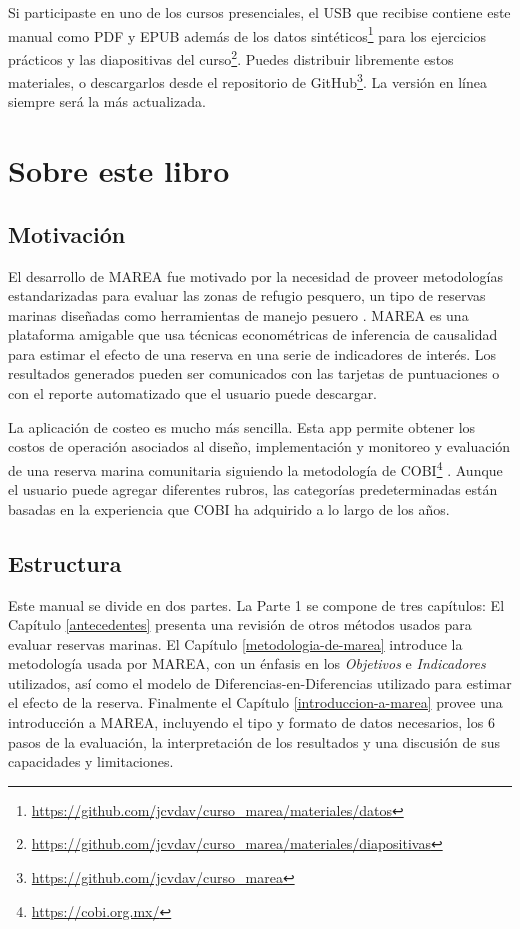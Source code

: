 \documentclass[]{krantz}
\renewcommand{\href}[2]{#2\footnote{\url{#1}}}
\begin{document}
Si participaste en uno de los cursos presenciales, el USB que recibise
contiene este manual como PDF y EPUB además de los
\href{https://github.com/jcvdav/curso_marea/materiales/datos}{datos
sintéticos} para los ejercicios prácticos y las
\href{https://github.com/jcvdav/curso_marea/materiales/diapositivas}{diapositivas
del curso}. Puedes distribuir libremente estos materiales, o
descargarlos desde el
\href{https://github.com/jcvdav/curso_marea}{repositorio de GitHub}. La
versión en línea siempre será la más actualizada.

\hypertarget{sobre-este-libro}{%
\section{Sobre este libro}\label{sobre-este-libro}}

\hypertarget{motivacion}{%
\subsection{Motivación}\label{motivacion}}

El desarrollo de MAREA fue motivado por la necesidad de proveer
metodologías estandarizadas para evaluar las zonas de refugio pesquero,
un tipo de reservas marinas diseñadas como herramientas de manejo
pesuero \citep{nom}. MAREA es una plataforma amigable que usa técnicas
econométricas de inferencia de causalidad para estimar el efecto de una
reserva en una serie de indicadores de interés. Los resultados generados
pueden ser comunicados con las tarjetas de puntuaciones o con el reporte
automatizado que el usuario puede descargar.

La aplicación de costeo es mucho más sencilla. Esta app permite obtener
los costos de operación asociados al diseño, implementación y monitoreo
y evaluación de una reserva marina comunitaria siguiendo la metodología
de \href{https://cobi.org.mx/}{COBI} \citep{uribe_2010}. Aunque el
usuario puede agregar diferentes rubros, las categorías predeterminadas
están basadas en la experiencia que COBI ha adquirido a lo largo de los
años.

\hypertarget{estructura}{%
\subsection{Estructura}\label{estructura}}

Este manual se divide en dos partes. La Parte 1 se compone de tres
capítulos: El Capítulo \ref{antecedentes} presenta una revisión de otros
métodos usados para evaluar reservas marinas. El Capítulo
\ref{metodologia-de-marea} introduce la metodología usada por MAREA, con
un énfasis en los \emph{Objetivos} e \emph{Indicadores} utilizados, así
como el modelo de Diferencias-en-Diferencias utilizado para estimar el
efecto de la reserva. Finalmente el Capítulo \ref{introduccion-a-marea}
provee una introducción a MAREA, incluyendo el tipo y formato de datos
necesarios, los 6 pasos de la evaluación, la interpretación de los
resultados y una discusión de sus capacidades y limitaciones.
\end{document}
